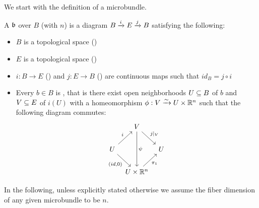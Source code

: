 \begin{myparagraph}
    We start with the definition of a microbundle.
\end{myparagraph}

\begin{mydefinition}[microbundle]
    A  $\bb$ over $B$ (with  $n$) is a diagram $\bundle{B}{E}{i}{j}$ satisfying the following:
    \begin{itemize}
        \item $B$ is a topological space ()
        \item $E$ is a topological space ()
        \item $i: B \to E$ () and $j: E \to B$ () are continuous maps such that $id_B = j \circ i$
        \item Every $b \in B$ is , that is there exist open neighborhoods $U \sub B$ of $b$ and $V \sub E$ of $i(U)$ with a homeomorphism $\phi: V \isomto U \times \R^n$ such that the following diagram commutes:
        \[
            \begin{tikzcd}[column sep=tiny]
                & V \ar[dr, "j\vert_V"] \ar[dd, "\psi"] & \\
                U \ar[ur, "i"] \ar[dr, "{(id, 0)}"'] & & U \\
                & U \times\R^n \ar[ur, "\pi_1"'] &
            \end{tikzcd}
        \]
    \end{itemize}
\end{mydefinition}

\begin{myremark}
    In the following, unless explicitly stated otherwise we assume the fiber dimension of any given microbundle to be $n$.
\end{myremark}